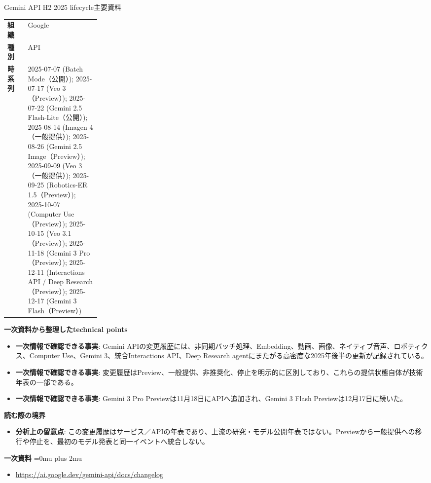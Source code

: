 \begin{technicalnote}{Gemini API H2 2025 lifecycle}{主要資料}
\begingroup
\begin{tabularx}{\linewidth}{@{}>{\bfseries}p{0.22\linewidth}X@{}}
組織 & Google \\
種別 & API \\
時系列 & 2025-07-07 (Batch Mode（公開）); 2025-07-17 (Veo 3（Preview）); 2025-07-22 (Gemini 2.5 Flash-Lite（公開）); 2025-08-14 (Imagen 4（一般提供）); 2025-08-26 (Gemini 2.5 Image（Preview）); 2025-09-09 (Veo 3（一般提供）); 2025-09-25 (Robotics-ER 1.5（Preview）); 2025-10-07 (Computer Use（Preview）); 2025-10-15 (Veo 3.1（Preview）); 2025-11-18 (Gemini 3 Pro（Preview）); 2025-12-11 (Interactions API / Deep Research（Preview）); 2025-12-17 (Gemini 3 Flash（Preview）) \\
\end{tabularx}
\smallskip
{\bfseries 一次資料から整理したtechnical points}
\begin{itemize}[leftmargin=1.5em,itemsep=0.35em]
\item \textbf{一次情報で確認できる事実}: Gemini APIの変更履歴には、非同期バッチ処理、Embedding、動画、画像、ネイティブ音声、ロボティクス、Computer Use、Gemini 3、統合Interactions API、Deep Research agentにまたがる高密度な2025年後半の更新が記録されている。
\item \textbf{一次情報で確認できる事実}: 変更履歴はPreview、一般提供、非推奨化、停止を明示的に区別しており、これらの提供状態自体が技術年表の一部である。
\item \textbf{一次情報で確認できる事実}: Gemini 3 Pro Previewは11月18日にAPIへ追加され、Gemini 3 Flash Previewは12月17日に続いた。
\end{itemize}
\begin{minipage}{\linewidth}
{\bfseries 読む際の境界}
\begin{itemize}[leftmargin=1.5em,itemsep=0.35em]
\item \textbf{分析上の留意点}: この変更履歴はサービス／APIの年表であり、上流の研究・モデル公開年表ではない。Previewから一般提供への移行や停止を、最初のモデル発表と同一イベントへ統合しない。
\end{itemize}
\begin{samepage}
{\bfseries 一次資料}
\begingroup\sloppy
\Urlmuskip=0mu plus 2mu\relax
\begin{itemize}[leftmargin=1.5em,itemsep=0.25em]
\item {\scriptsize\url{https://ai.google.dev/gemini-api/docs/changelog}}
\end{itemize}
\endgroup
\end{samepage}
\end{minipage}
\endgroup
\end{technicalnote}
\medskip

